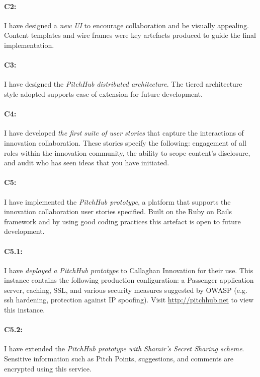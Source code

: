 \paragraph{C2:} I have designed a {\em new UI} to encourage collaboration and be visually appealing. Content templates and wire frames were key artefacts produced to guide the final implementation.

\paragraph{C3:} I have designed the {\em PitchHub distributed architecture}. The tiered architecture style adopted supports ease of extension for future development.

\paragraph{C4:} I have developed {\em the first suite of user stories} that capture the interactions of innovation collaboration. These stories specify the following: engagement of all roles within the innovation community, the ability to scope content's disclosure, and audit who has seen ideas that you have initiated.

\paragraph{C5:} I have implemented the {\em PitchHub prototype}, a platform that supports the innovation collaboration user stories specified. Built on the Ruby on Rails framework and by using good coding practices this artefact is open to future development.

\paragraph{C5.1:} I have {\em deployed a PitchHub prototype} to Callaghan Innovation for their use. This instance contains the following production configuration: a Passenger application server, caching, SSL, and various security measures suggested by OWASP (e.g. ssh hardening, protection against IP spoofing). Visit \url{http://pitchhub.net} to view this instance.


\paragraph{C5.2:} I have extended the {\em PitchHub prototype with Shamir's Secret Sharing scheme}. Sensitive information such as Pitch Points, suggestions, and comments are encrypted using this service.

